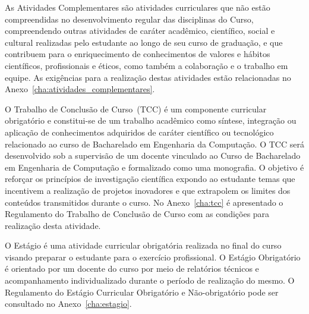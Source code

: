 As Atividades Complementares são atividades curriculares que não estão compreendidas no desenvolvimento regular das disciplinas do Curso, compreendendo
outras atividades de caráter acadêmico, científico, social e cultural realizadas pelo estudante ao longo de seu curso de graduação, e que contribuem para o enriquecimento de conhecimentos de valores e hábitos científicos, profissionais e éticos, como também a colaboração e o trabalho em equipe. As exigências para a realização destas atividades estão relacionadas no Anexo~\ref{cha:atividades_complementares}.

O Trabalho de Conclusão de Curso~(TCC) é um componente curricular obrigatório e constitui-se de um trabalho acadêmico como síntese, integração ou aplicação de conhecimentos adquiridos de caráter científico ou tecnológico relacionado ao curso de Bacharelado em Engenharia da Computação. O TCC será desenvolvido sob a supervisão de um docente vinculado ao Curso de Bacharelado em Engenharia de Computação e formalizado como uma monografia. O objetivo é reforçar os princípios de investigação científica expondo ao estudante temas que incentivem a realização de projetos inovadores e que extrapolem os limites dos conteúdos transmitidos durante o curso. No Anexo~\ref{cha:tcc} é apresentado o Regulamento do Trabalho de Conclusão de Curso com as condições para realização desta atividade.

O Estágio é uma atividade curricular obrigatória realizada no final do curso visando preparar o estudante para o exercício profissional. O Estágio Obrigatório é orientado por um docente do curso por meio de relatórios técnicos e acompanhamento individualizado durante o período de realização do mesmo. O Regulamento do Estágio Curricular Obrigatório e Não-obrigatório pode ser consultado no Anexo~\ref{cha:estagio}.


